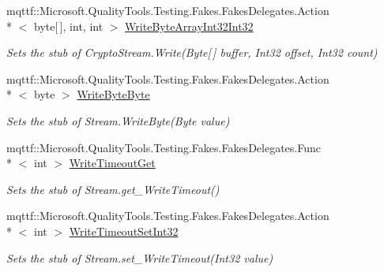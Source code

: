 \begin{DoxyCompactItemize}
mqttf\-::\-Microsoft.\-Quality\-Tools.\-Testing.\-Fakes.\-Fakes\-Delegates.\-Action\\*
$<$ byte\mbox{[}$\,$\mbox{]}, int, int $>$ \hyperlink{class_system_1_1_security_1_1_cryptography_1_1_fakes_1_1_stub_crypto_stream_a4ef84d2b5217af0fa80d88fc45680393}{Write\-Byte\-Array\-Int32\-Int32}
\begin{DoxyCompactList}\small\item\em Sets the stub of Crypto\-Stream.\-Write(\-Byte\mbox{[}$\,$\mbox{]} buffer, Int32 offset, Int32 count)\end{DoxyCompactList}\item 
mqttf\-::\-Microsoft.\-Quality\-Tools.\-Testing.\-Fakes.\-Fakes\-Delegates.\-Action\\*
$<$ byte $>$ \hyperlink{class_system_1_1_security_1_1_cryptography_1_1_fakes_1_1_stub_crypto_stream_a3f31617ac1c97eb12f818ee8e21dd298}{Write\-Byte\-Byte}
\begin{DoxyCompactList}\small\item\em Sets the stub of Stream.\-Write\-Byte(\-Byte value)\end{DoxyCompactList}\item 
mqttf\-::\-Microsoft.\-Quality\-Tools.\-Testing.\-Fakes.\-Fakes\-Delegates.\-Func\\*
$<$ int $>$ \hyperlink{class_system_1_1_security_1_1_cryptography_1_1_fakes_1_1_stub_crypto_stream_a49cc1d261dd8f36119c8108b36fa8db3}{Write\-Timeout\-Get}
\begin{DoxyCompactList}\small\item\em Sets the stub of Stream.\-get\-\_\-\-Write\-Timeout()\end{DoxyCompactList}\item 
mqttf\-::\-Microsoft.\-Quality\-Tools.\-Testing.\-Fakes.\-Fakes\-Delegates.\-Action\\*
$<$ int $>$ \hyperlink{class_system_1_1_security_1_1_cryptography_1_1_fakes_1_1_stub_crypto_stream_ae42080b57dc0086a3062c0a4e84d269d}{Write\-Timeout\-Set\-Int32}
\begin{DoxyCompactList}\small\item\em Sets the stub of Stream.\-set\-\_\-\-Write\-Timeout(\-Int32 value)\end{DoxyCompactList}\end{DoxyCompactItemize}
